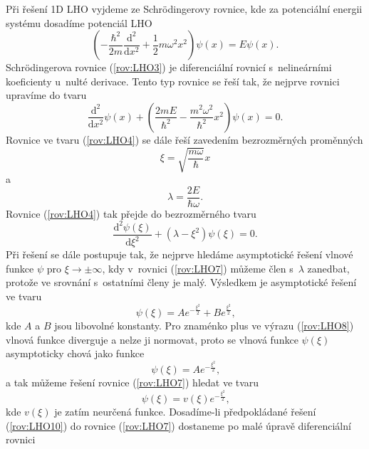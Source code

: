 Při řešení 1D LHO vyjdeme ze Schrödingerovy rovnice, kde za potenciální energii systému dosadíme potenciál LHO
\begin{equation}
\left( -\frac{\hbar^2}{2m}\frac{\mathrm{d}^2}{\mathrm{d}x^2} + \frac{1}{2}m\omega^2x^2 \right) \psi(x) = E\psi(x) \mbox{.}
\label{rov:LHO3}
\end{equation}
Schrödingerova rovnice (\ref{rov:LHO3}) je diferenciální rovnicí s~nelineárními koeficienty u~nulté derivace. Tento typ rovnice se řeší tak, že nejprve rovnici upravíme do tvaru
\begin{equation}
\frac{\mathrm{d}^2}{\mathrm{d}x^2} \psi(x) + \left( \frac{2mE}{\hbar^2} - \frac{m^2\omega^2}{\hbar^2} x^2 \right) \psi(x) = 0 \mbox{.}
\label{rov:LHO4}
\end{equation}
Rovnice ve tvaru (\ref{rov:LHO4}) se dále řeší zavedením bezrozměrných proměnných
\begin{equation}
\xi = \sqrt{\frac{m \omega}{\hbar}} x
\label{rov:LHO5}
\end{equation}
a
\begin{equation}
\lambda = \frac{2E}{\hbar \omega} \mbox{.}
\label{rov:LHO6}
\end{equation}
Rovnice (\ref{rov:LHO4}) tak přejde do bezrozměrného tvaru
\begin{equation}
\frac{\mathrm{d}^2 \psi(\xi)}{\mathrm{d}\xi^2} + (\lambda - \xi^2)\psi(\xi) = 0 \mbox{.}
\label{rov:LHO7}
\end{equation}
Při řešení se dále postupuje tak, že nejprve hledáme asymptotické řešení vlnové funkce $\psi$ pro $\xi \rightarrow \pm \infty$, kdy v~rovnici (\ref{rov:LHO7}) můžeme člen s~$\lambda$ zanedbat, protože ve srovnání s~ostatními členy je malý.  Výsledkem je asymptotické řešení ve tvaru
\begin{equation}
\psi(\xi) = A e^{-\frac{\xi^2}{2}} + B e^{\frac{\xi^2}{2}} \mbox{,}
\label{rov:LHO8}
\end{equation}
kde $A$ a $B$ jsou libovolné konstanty. Pro znaménko plus ve výrazu (\ref{rov:LHO8}) vlnová funkce diverguje a nelze ji normovat, proto se vlnová funkce $\psi(\xi)$ asymptoticky chová jako funkce
\begin{equation}
\psi(\xi) = A e^{-\frac{\xi^2}{2}} \mbox{,}
\label{rov:LHO9}
\end{equation}
a tak můžeme řešení rovnice (\ref{rov:LHO7}) hledat ve tvaru
\begin{equation}
\psi(\xi) = v(\xi)e^{-\frac{\xi^2}{2}} \mbox{,}
\label{rov:LHO10}
\end{equation}
kde $v(\xi)$ je zatím neurčená funkce. Dosadíme-li předpokládané řešení (\ref{rov:LHO10}) do rovnice (\ref{rov:LHO7}) dostaneme po malé úpravě diferenciální rovnici
